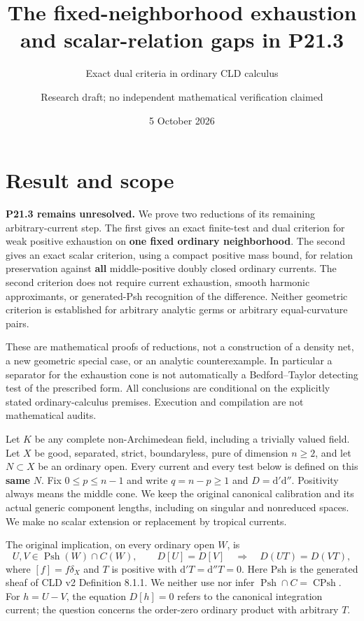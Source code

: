 \documentclass[
  11pt,
]{article}
\title{The fixed-neighborhood exhaustion and scalar-relation gaps in
P21.3}
\subtitle{Exact dual criteria in ordinary CLD calculus}
\author{Research draft; no independent mathematical verification
claimed}
\date{5 October 2026}
\begin{document}
\maketitle

\section{Result and scope}\label{result-and-scope}

\textbf{P21.3 remains unresolved.} We prove two reductions of its
remaining arbitrary-current step. The first gives an exact finite-test
and dual criterion for weak positive exhaustion on \textbf{one fixed
ordinary neighborhood}. The second gives an exact scalar criterion,
using a compact positive mass bound, for relation preservation against
\textbf{all} middle-positive doubly closed ordinary currents. The second
criterion does not require current exhaustion, smooth harmonic
approximants, or generated-Psh recognition of the difference. Neither
geometric criterion is established for arbitrary analytic germs or
arbitrary equal-curvature pairs.

These are mathematical proofs of reductions, not a construction of a
density net, a new geometric special case, or an analytic
counterexample. In particular a separator for the exhaustion cone is not
automatically a Bedford--Taylor detecting test of the prescribed form.
All conclusions are conditional on the explicitly stated
ordinary-calculus premises. Execution and compilation are not
mathematical audits.

Let \(K\) be any complete non-Archimedean field, including a trivially
valued field. Let \(X\) be good, separated, strict, boundaryless, pure
of dimension \(n\geq2\), and let \(N\subset X\) be an ordinary open.
Every current and every test below is defined on this \textbf{same}
\(N\). Fix \(0\leq p\leq n-1\) and write \(q=n-p\geq1\) and
\(D=\mathrm d'\mathrm d''\). Positivity always means the middle cone. We
keep the original canonical calibration and its actual generic component
lengths, including on singular and nonreduced spaces. We make no scalar
extension or replacement by tropical currents.

The original implication, on every ordinary open \(W\), is \[
 U,V\in\operatorname{Psh}(W)\cap C(W),\qquad D[U]=D[V]
 \quad\Longrightarrow\quad D(UT)=D(VT),                    \tag{Q}
\] where \([f]=f\delta_X\) and \(T\) is positive with
\(\mathrm d'T=\mathrm d''T=0\). Here Psh is the generated sheaf of CLD
v2 Definition 8.1.1. We neither use nor infer
\(\operatorname{Psh}\cap C=\operatorname{CPsh}\). For \(h=U-V\), the
equation \(D[h]=0\) refers to the canonical integration current; the
question concerns the order-zero ordinary product with arbitrary \(T\).
\end{document}
